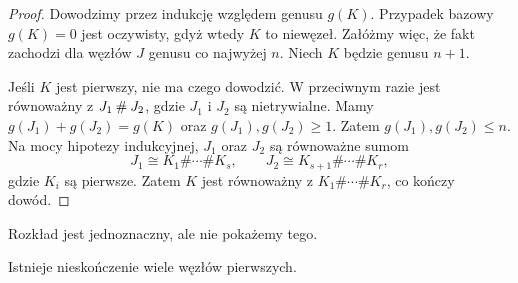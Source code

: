 \begin{proof}
    Dowodzimy przez indukcję względem genusu $g(K)$.
    Przypadek bazowy $g(K) = 0$ jest oczywisty, gdyż wtedy $K$ to niewęzeł.
    Załóżmy więc, że fakt zachodzi dla węzłów $J$ genusu co najwyżej $n$.
    Niech $K$ będzie genusu $n + 1$.

    Jeśli $K$ jest pierwszy, nie ma czego dowodzić.
    W przeciwnym razie jest równoważny z $J_1 \mathbin{\#} J_2$, gdzie $J_1$ i $J_2$ są nietrywialne.
    Mamy $g(J_1)+g(J_2)=g(K)$ oraz $g(J_1),g(J_2)\geqslant 1$.
    Zatem $g(J_1),g(J_2)\leqslant n$.
    Na mocy hipotezy indukcyjnej, $J_1$ oraz $J_2$ są równoważne sumom
    \[
        J_1 \cong K_1\#\cdots\# K_s,\qquad
        J_2 \cong K_{s+1}\#\cdots\# K_r,
    \]
    gdzie $K_i$ są pierwsze.
    Zatem $K$ jest równoważny z $K_1\#\cdots\# K_r$, co kończy dowód.
\end{proof}

Rozkład jest jednoznaczny, ale nie pokażemy tego.

\begin{proposition}
\label{infty_primes}
    Istnieje nieskończenie wiele węzłów pierwszych.
\end{proposition}

